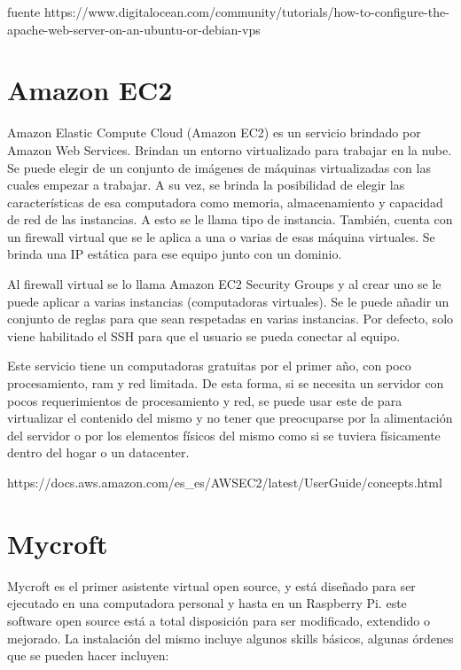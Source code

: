 fuente 
https://www.digitalocean.com/community/tutorials/how-to-configure-the-apache-web-server-on-an-ubuntu-or-debian-vps

\section{Amazon EC2}

Amazon Elastic Compute Cloud (Amazon EC2) es un servicio brindado por Amazon Web Services. Brindan un entorno virtualizado para trabajar en la nube. Se puede elegir de un conjunto de imágenes de máquinas virtualizadas con las cuales empezar  a trabajar. A su vez, se brinda la posibilidad de elegir las características de esa computadora como memoria, almacenamiento y capacidad de red de las instancias. A esto se le llama tipo de instancia. También, cuenta con un firewall virtual que se le aplica a una o varias de esas máquina virtuales. Se brinda una IP estática para ese equipo junto con un dominio. 

Al firewall virtual se lo llama Amazon EC2 Security Groups y al crear uno se le puede aplicar a varias instancias (computadoras virtuales). Se le puede añadir un conjunto de reglas para que sean respetadas en varias instancias. Por defecto, solo viene habilitado el SSH para que el usuario se pueda conectar al equipo.

Este servicio tiene un computadoras gratuitas por el primer año, con poco procesamiento, ram y red limitada. De esta forma, si se necesita un servidor con pocos requerimientos de procesamiento y red, se puede usar este de para virtualizar el contenido del mismo y no tener que preocuparse por la alimentación del servidor o por los elementos físicos del mismo como si se tuviera físicamente dentro del hogar o un datacenter.

https://docs.aws.amazon.com/es_es/AWSEC2/latest/UserGuide/concepts.html


\section{Mycroft}
Mycroft es el primer asistente virtual open source, y está diseñado para ser ejecutado en una computadora personal y hasta en un Raspberry Pi. este software open source está a total disposición para ser modificado, extendido o mejorado. 
La instalación del mismo incluye algunos skills básicos, algunas órdenes que se pueden hacer incluyen:

